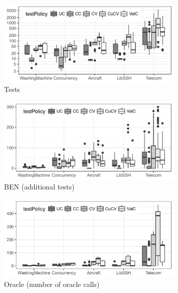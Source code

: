 \begin{tikzborder}{\cite{Gargantini16:validation}}
\begin{tikzborder}{\cite{gargantini_combinatorial_2017}}
\begin{tikzborder}{\cite{gargantini_combinatorial_2017}}
\begin{figure}
	\centering
	\begin{subfigure}[b]{0.74\textwidth}
		\includegraphics[width=0.98\textwidth]{data/initTests.pdf}
		\caption{Tests}\label{fig:initTests}
	\end{subfigure}
	\begin{subfigure}[b]{0.74\textwidth}
		\centering
		\includegraphics[width=0.98\textwidth]{data/BENTests.pdf}
		\caption{BEN (additional tests)}\label{fig:ben}
	\end{subfigure}
	\begin{subfigure}[b]{0.74\textwidth}
		\centering
		\includegraphics[width=0.98\textwidth]{data/oraclecalls.png}
		\caption{Oracle (number of oracle calls)}
	\end{subfigure}
	\begin{subfigure}[b]{0.74\textwidth}

\end{subfigure}
\end{figure}
\end{tikzborder}
\end{tikzborder}
\end{tikzborder}
